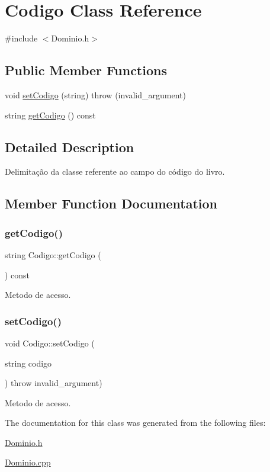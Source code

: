 \hypertarget{class_codigo}{}\section{Codigo Class Reference}
\label{class_codigo}


{\ttfamily \#include $<$Dominio.\+h$>$}

\subsection*{Public Member Functions}
\begin{DoxyCompactItemize}
\item 
void \hyperlink{class_codigo_a863651a26dd7112dccced628aa96d86e}{set\+Codigo} (string)  throw (invalid\+\_\+argument)
\item 
string \hyperlink{class_codigo_ac263b3f7ff4f995fa72ad9101f1a8533}{get\+Codigo} () const
\end{DoxyCompactItemize}


\subsection{Detailed Description}
Delimitação da classe referente ao campo do código do livro. 

\subsection{Member Function Documentation}
\mbox{\label{class_codigo_ac263b3f7ff4f995fa72ad9101f1a8533}} 
\subsubsection{\texorpdfstring{get\+Codigo()}{getCodigo()}}
{\footnotesize\ttfamily string Codigo\+::get\+Codigo (\begin{DoxyParamCaption}{ }\end{DoxyParamCaption}) const\hspace{0.3cm}{\ttfamily [inline]}}

Metodo de acesso. \mbox{\label{class_codigo_a863651a26dd7112dccced628aa96d86e}} 
\subsubsection{\texorpdfstring{set\+Codigo()}{setCodigo()}}
{\footnotesize\ttfamily void Codigo\+::set\+Codigo (\begin{DoxyParamCaption}\item[{string}]{codigo }\end{DoxyParamCaption}) throw  invalid\+\_\+argument) }

Metodo de acesso. 

The documentation for this class was generated from the following files\+:\begin{DoxyCompactItemize}
\item 
\hyperlink{_dominio_8h}{Dominio.\+h}\item 
\hyperlink{_dominio_8cpp}{Dominio.\+cpp}\end{DoxyCompactItemize}
